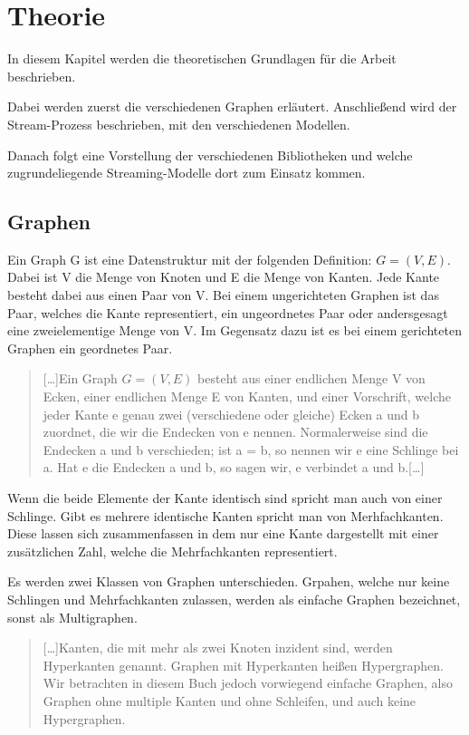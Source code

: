 \chapter{Theorie}
In diesem Kapitel werden die theoretischen Grundlagen für die Arbeit beschrieben.

Dabei werden zuerst die verschiedenen Graphen erläutert. Anschließend wird der
Stream-Prozess beschrieben, mit den verschiedenen Modellen.

Danach folgt eine Vorstellung der verschiedenen Bibliotheken und welche
zugrundeliegende Streaming-Modelle dort zum Einsatz kommen. 

\section{Graphen}
Ein Graph G ist eine Datenstruktur mit der folgenden Definition: $G = (V,E)$.
Dabei ist V die Menge von Knoten und E die Menge von Kanten. Jede Kante besteht
dabei aus einen Paar von V. Bei einem ungerichteten Graphen ist das Paar, welches
die Kante representiert, ein ungeordnetes Paar oder andersgesagt eine
zweielementige Menge von V. Im Gegensatz dazu ist es bei einem gerichteten
Graphen ein geordnetes Paar.

\blockquote[\cite{Aigner2015}]{
[\dots]Ein Graph $G = (V,E)$ besteht aus einer endlichen Menge V von Ecken,
einer endlichen Menge E von Kanten, und einer Vorschrift, welche jeder Kante e
genau zwei (verschiedene oder gleiche) Ecken a und b zuordnet, die wir die
Endecken von e nennen. Normalerweise sind die Endecken a und b verschieden;
ist a = b, so nennen wir e eine Schlinge bei a. Hat e die Endecken a und b, so
sagen wir, e verbindet a und b.[\dots]}

Wenn die beide Elemente der Kante identisch sind spricht man auch von einer
Schlinge. Gibt es mehrere identische Kanten spricht man von Merhfachkanten.
Diese lassen sich zusammenfassen in dem nur eine Kante dargestellt mit einer
zusätzlichen Zahl, welche die Mehrfachkanten representiert.

Es werden zwei Klassen von Graphen unterschieden. Grpahen, welche nur keine
Schlingen und Mehrfachkanten zulassen, werden als einfache Graphen bezeichnet,
sonst als Multigraphen.

\blockquote[\cite{Gurski2010}]{
[\dots]Kanten, die mit mehr als zwei Knoten inzident sind, werden Hyperkanten
genannt. Graphen mit Hyperkanten heißen Hypergraphen. Wir betrachten in diesem
Buch jedoch vorwiegend einfache Graphen, also Graphen ohne multiple Kanten und
ohne Schleifen, und auch keine Hypergraphen.}

